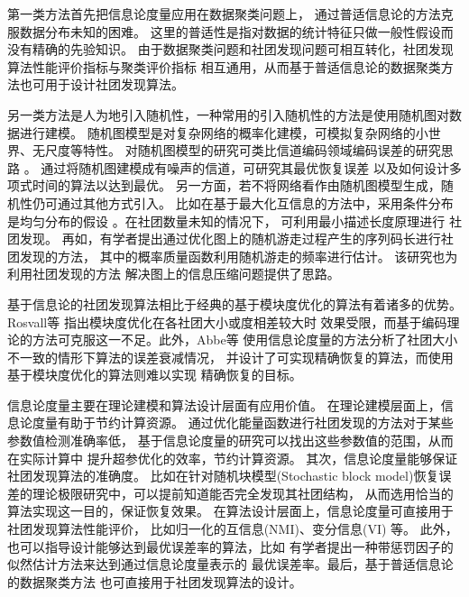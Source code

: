 第一类方法首先把信息论度量应用在数据聚类问题上，
通过普适信息论的方法克服数据分布未知的困难\cite{raman20219}。
这里的普适性是指对数据的统计特征只做一般性假设而没有精确的先验知识。
由于数据聚类问题和社团发现问题可相互转化，社团发现算法性能评价指标与聚类评价指标
相互通用，从而基于普适信息论的数据聚类方法也可用于设计社团发现算法。

另一类方法是人为地引入随机性，一种常用的引入随机性的方法是使用随机图对数据进行建模。
随机图模型是对复杂网络的概率化建模，可模拟复杂网络的小世界、无尺度等特性。
对随机图模型的研究可类比信道编码领域编码误差的研究思路 \cite{abbe2015community}。
通过将随机图建模成有噪声的信道，可研究其最优恢复误差
以及如何设计多项式时间的算法以达到最优。
另一方面，若不将网络看作由随机图模型生成，随机性仍可通过其他方式引入。
比如在基于最大化互信息的方法中，采用条件分布是均匀分布的假设
\cite{rosvall2007information}。在社团数量未知的情况下，
可利用最小描述长度原理进行
社团发现\cite{chakrabarti2004autopart,rosvall2007information}。
再如，有学者提出通过优化图上的随机游走过程产生的序列码长进行社团发现的方法，
其中的概率质量函数利用随机游走的频率进行估计\cite{rosvall2008mcl}。
该研究也为利用社团发现的方法
解决图上的信息压缩问题提供了思路\cite{abbe17sideinfo}。

基于信息论的社团发现算法相比于经典的基于模块度优化的算法有着诸多的优势。
Rosvall等\cite{rosvall2007information} 指出模块度优化在各社团大小或度相差较大时
效果受限，而基于编码理论的方法可克服这一不足。此外，Abbe等\cite{abbe2015community,hajek2016achieving} 
使用信息论度量的方法分析了社团大小不一致的情形下算法的误差衰减情况，
并设计了可实现精确恢复的算法，而使用基于模块度优化的算法则难以实现
精确恢复的目标。

信息论度量主要在理论建模和算法设计层面有应用价值。
在理论建模层面上，信息论度量有助于节约计算资源。
通过优化能量函数进行社团发现的方法对于某些参数值检测准确率低，
基于信息论度量的研究可以找出这些参数值的范围，从而在实际计算中
提升超参优化的效率，节约计算资源\cite{ye2020exact}。
其次，信息论度量能够保证社团发现算法的准确度。
比如在针对随机块模型(Stochastic block model)恢复误差的理论极限研究中，可以提前知道能否完全发现其社团结构，
从而选用恰当的算法实现这一目的，保证恢复效果\cite{abbe2015community}。
在算法设计层面上，信息论度量可直接用于社团发现算法性能评价，
比如归一化的互信息(NMI)\cite{Danon_2005}、变分信息(VI) \cite{2007Comparing}等。
此外，也可以指导设计能够达到最优误差率的算法，比如
有学者提出一种带惩罚因子的似然估计方法来达到通过信息论度量表示的
最优误差率\cite{zhang2016}。最后，基于普适信息论的数据聚类方法
也可直接用于社团发现算法的设计\cite{gokcay2002clustering, chan2017pin, app12094203}。

